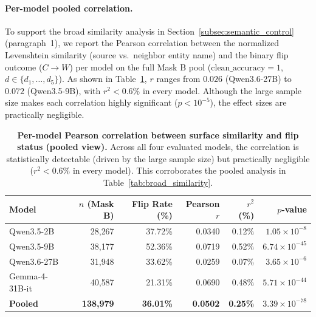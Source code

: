 \paragraph{Per-model pooled correlation.}
To support the broad similarity analysis in Section~\ref{subsec:semantic_control} (paragraph~1), we report the Pearson correlation between the normalized Levenshtein similarity (source vs.\ neighbor entity name) and the binary flip outcome ($C \rightarrow W$) per model on the full Mask B pool ($\text{clean\_accuracy} = 1$, $d \in \{d_1, \dots, d_5\}$). As shown in Table~\ref{tab:permodel_pooled_r}, $r$ ranges from $0.026$ (Qwen3.6-27B) to $0.072$ (Qwen3.5-9B), with $r^2 < 0.6\%$ in every model. Although the large sample size makes each correlation highly significant ($p < 10^{-5}$), the effect sizes are practically negligible.

\begin{table}[!htbp]
\centering
\small
\begin{tabular}{lrrrrr}
\toprule
\textbf{Model} & \textbf{$n$ (Mask B)} & \textbf{Flip Rate (\%)} & \textbf{Pearson $r$} & \textbf{$r^2$ (\%)} & \textbf{$p$-value} \\
\midrule
Qwen3.5-2B      &  28{,}267 & 37.72\% & 0.0340 & 0.12\% & $1.05 \times 10^{-8}$ \\
Qwen3.5-9B      &  38{,}177 & 52.36\% & 0.0719 & 0.52\% & $6.74 \times 10^{-45}$ \\
Qwen3.6-27B     &  31{,}948 & 33.62\% & 0.0259 & 0.07\% & $3.65 \times 10^{-6}$ \\
Gemma-4-31B-it  &  40{,}587 & 21.31\% & 0.0690 & 0.48\% & $5.71 \times 10^{-44}$ \\
\midrule
\textbf{Pooled} & \textbf{138{,}979} & \textbf{36.01\%} & \textbf{0.0502} & \textbf{0.25\%} & \textbf{$3.39 \times 10^{-78}$} \\
\bottomrule
\end{tabular}
\caption{\textbf{Per-model Pearson correlation between surface similarity and flip status (pooled view).} Across all four evaluated models, the correlation is statistically detectable (driven by the large sample size) but practically negligible ($r^2 < 0.6\%$ in every model). This corroborates the pooled analysis in Table~\ref{tab:broad_similarity}.}
\label{tab:permodel_pooled_r}
\end{table}

